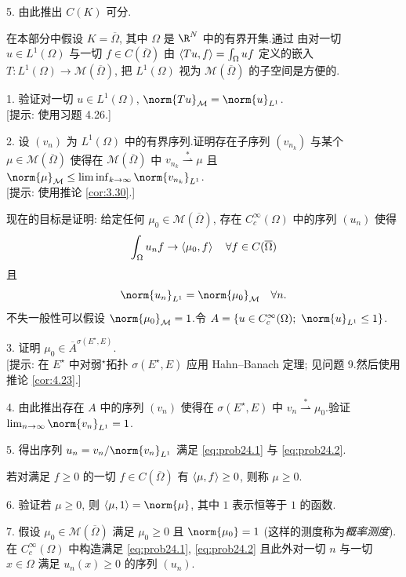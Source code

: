 \begin{problem}[第 1, 3, 4 章]
5. 由此推出 $C(K)$ 可分.


在本部分中假设 $K=\overline\Omega$, 其中 $\Omega$ 是 $\R^N$ 中的有界开集.通过
由对一切 $u\in L^1(\Omega)$ 与一切 $f\in C(\overline\Omega)$ 由
$\left\langle Tu,f\right\rangle=\int_\Omega uf$ 定义的嵌入 $T:L^1(\Omega)\to\mathcal{M}(\overline\Omega)$,
把 $L^1(\Omega)$ 视为 $\mathcal{M}(\overline\Omega)$ 的子空间是方便的.

1. 验证对一切 $u\in L^1(\Omega)$, $\norm{Tu}_{\mathcal{M}}=\norm{u}_{L^1}$.\\
{[提示: 使用习题 4.26.]}

2. 设 $(v_n)$ 为 $L^1(\Omega)$ 中的有界序列.证明存在子序列 $(v_{n_k})$ 与某个
$\mu\in\mathcal{M}(\overline\Omega)$ 使得在 $\mathcal{M}(\overline\Omega)$ 中
$v_{n_k}\overset{*}{\rightharpoonup}\mu$ 且
$\norm{\mu}_{\mathcal{M}}\le\liminf_{k\to\infty}\norm{v_{n_k}}_{L^1}$.\\
{[提示: 使用推论  \ref{cor:3.30}.]}

现在的目标是证明: 给定任何 $\mu_0\in\mathcal{M}(\overline\Omega)$, 存在 $C_c^\infty(\Omega)$
中的序列 $(u_n)$ 使得
\begin{equation}
\int_\Omega u_nf\to\left\langle \mu_0,f\right\rangle\quad\forall f\in C(\overline\Omega)
\label{eq:prob24.1}
\end{equation}
且
\begin{equation}
\norm{u_n}_{L^1}=\norm{\mu_0}_{\mathcal{M}}\quad\forall n.
\label{eq:prob24.2}
\end{equation}
不失一般性可以假设 $\norm{\mu_0}_{\mathcal{M}}=1$.令
$A=\{u\in C_c^\infty(\Omega);\ \norm{u}_{L^1}\le1\}$.

3. 证明 $\mu_0\in\overline A^{\sigma(E^\star,E)}$.\\
{[提示: 在 $E^\star$ 中对弱$^\star$拓扑 $\sigma(E^\star,E)$ 应用 Hahn--Banach 定理;
见问题 9.然后使用推论  \ref{cor:4.23}.]}

4. 由此推出存在 $A$ 中的序列 $(v_n)$ 使得在 $\sigma(E^\star,E)$ 中
$v_n\overset{*}{\rightharpoonup}\mu_0$.验证 $\lim_{n\to\infty}\norm{v_n}_{L^1}=1$.

5. 得出序列 $u_n=v_n/\norm{v_n}_{L^1}$ 满足 \eqref{eq:prob24.1} 与 \eqref{eq:prob24.2}.

若对满足 $f\ge0$ 的一切 $f\in C(\overline\Omega)$ 有 $\left\langle \mu,f\right\rangle\ge0$, 则称
$\mu\ge0$.

6. 验证若 $\mu\ge0$, 则 $\dual{\mu}{1}=\norm{\mu}$, 其中 $1$ 表示恒等于 $1$ 的函数.

7. 假设 $\mu_0\in\mathcal{M}(\overline\Omega)$ 满足 $\mu_0\ge0$ 且 $\norm{\mu_0}=1$
(这样的测度称为\emph{概率测度}).在 $C_c^\infty(\Omega)$ 中构造满足 \eqref{eq:prob24.1}, \eqref{eq:prob24.2} 且此外对一切 $n$ 与一切 $x\in\Omega$ 满足 $u_n(x)\ge0$ 的序列 $(u_n)$.


\end{problem}
